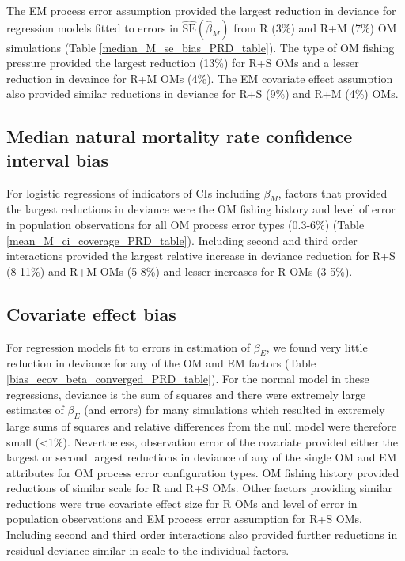 \documentclass[
  12pt,
]{article}
\begin{document}
The EM process error assumption provided the largest reduction in
deviance for regression models fitted to errors in
\(\widehat {\text{SE}}\left(\widehat \beta_M\right)\) from R (3\%) and
R+M (7\%) OM simulations (Table \ref{median_M_se_bias_PRD_table}). The
type of OM fishing pressure provided the largest reduction (13\%) for
R+S OMs and a lesser reduction in devaince for R+M OMs (4\%). The EM
covariate effect assumption also provided similar reductions in deviance
for R+S (9\%) and R+M (4\%) OMs.

\subsection*{Median natural mortality rate confidence interval
bias}\label{median-natural-mortality-rate-confidence-interval-bias}

For logistic regressions of indicators of CIs including \(\beta_M\),
factors that provided the largest reductions in deviance were the OM
fishing history and level of error in population observations for all OM
process error types (0.3-6\%) (Table
\ref{mean_M_ci_coverage_PRD_table}). Including second and third order
interactions provided the largest relative increase in deviance
reduction for R+S (8-11\%) and R+M OMs (5-8\%) and lesser increases for
R OMs (3-5\%).

\subsection*{Covariate effect bias}\label{covariate-effect-bias}

For regression models fit to errors in estimation of \(\beta_E\), we
found very little reduction in deviance for any of the OM and EM factors
(Table \ref{bias_ecov_beta_converged_PRD_table}). For the normal model
in these regressions, deviance is the sum of squares and there were
extremely large estimates of \(\beta_E\) (and errors) for many
simulations which resulted in extremely large sums of squares and
relative differences from the null model were therefore small
(\textless1\%). Nevertheless, observation error of the covariate
provided either the largest or second largest reductions in deviance of
any of the single OM and EM attributes for OM process error
configuration types. OM fishing history provided reductions of similar
scale for R and R+S OMs. Other factors providing similar reductions were
true covariate effect size for R OMs and level of error in population
observations and EM process error assumption for R+S OMs. Including
second and third order interactions also provided further reductions in
residual deviance similar in scale to the individual factors.
\end{document}
